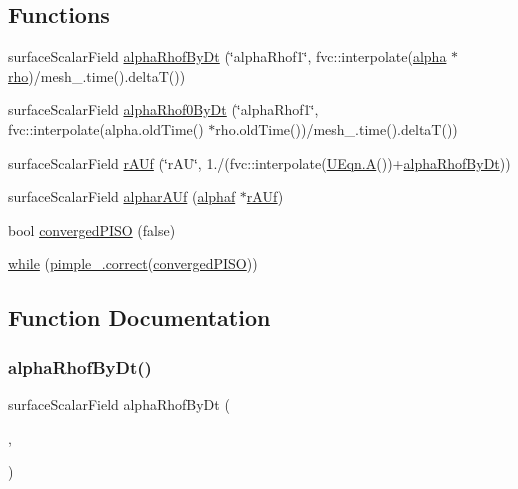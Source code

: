 \subsection*{Functions}
\begin{DoxyCompactItemize}
\item 
surface\+Scalar\+Field \hyperlink{pEqnf__1p_8H_a6d59cfd82207560ab917964ef9d0946a}{alpha\+Rhof\+By\+Dt} (\char`\"{}alpha\+Rhof1\char`\"{}, fvc\+::interpolate(\hyperlink{UEqn__1pl_8H_a7fe02434a19f3e00e927f32adcbb193b}{alpha} $\ast$\hyperlink{EEqn__1pl_8H_ac955f87ac2b79f02f420cae087fc52b1}{rho})/mesh\+\_\+.\+time().deltaT())
\item 
surface\+Scalar\+Field \hyperlink{pEqnf__1p_8H_a6d42a1cc03b686a3af950d2d303d179e}{alpha\+Rhof0\+By\+Dt} (\char`\"{}alpha\+Rhof1\char`\"{}, fvc\+::interpolate(alpha.\+old\+Time() $\ast$rho.\+old\+Time())/mesh\+\_\+.\+time().deltaT())
\item 
surface\+Scalar\+Field \hyperlink{pEqnf__1p_8H_ac3130f35ba3885c27002bbb7b29af745}{r\+A\+Uf} (\char`\"{}r\+AU\char`\"{}, 1./(fvc\+::interpolate(\hyperlink{solvePointKinetics_8H_af0b39a25157c5a983e067e9f3176f91f}{U\+Eqn.\+A}())+\hyperlink{pEqnf__1p_8H_a6d59cfd82207560ab917964ef9d0946a}{alpha\+Rhof\+By\+Dt}))
\item 
surface\+Scalar\+Field \hyperlink{pEqnf__1p_8H_a8a083a37dcea5a06783fda0135fb484b}{alphar\+A\+Uf} (\hyperlink{pEqn__1pl_8H_af4804c4f6fe5c6e70b7d387bc1608640}{alphaf} $\ast$\hyperlink{calcrAUfSetSnGradCalcComp__1p_8H_a61479bb7ccdc1151cea5792eab56d00e}{r\+A\+Uf})
\item 
bool \hyperlink{pEqnf__1p_8H_a7378b3cca14609b2f41dab30069eb9c4}{converged\+P\+I\+SO} (false)
\item 
\hyperlink{pEqnf__1p_8H_a6e6ddb24845d3c5c3906e45d968e9448}{while} (\hyperlink{hEqn_8H_a3a2458f7f54158be848527a3fdedd5dd}{pimple\+\_\+.\+correct}(\hyperlink{pEqnf__2p_8H_a7378b3cca14609b2f41dab30069eb9c4}{converged\+P\+I\+SO}))
\end{DoxyCompactItemize}


\subsection{Function Documentation}
\mbox{\label{pEqnf__1p_8H_a6d59cfd82207560ab917964ef9d0946a}} 
\subsubsection{\texorpdfstring{alpha\+Rhof\+By\+Dt()}{alphaRhofByDt()}}
{\footnotesize\ttfamily surface\+Scalar\+Field alpha\+Rhof\+By\+Dt (\begin{DoxyParamCaption}\item[{\char`\"{}alpha\+Rhof1\char`\"{}}]{,  }\item[{fvc\+::interpolate(\hyperlink{UEqn__1pl_8H_a7fe02434a19f3e00e927f32adcbb193b}{alpha} $\ast$\hyperlink{EEqn__1pl_8H_ac955f87ac2b79f02f420cae087fc52b1}{rho})/mesh\+\_\+.\+time().deltaT()}]{ }\end{DoxyParamCaption})}

